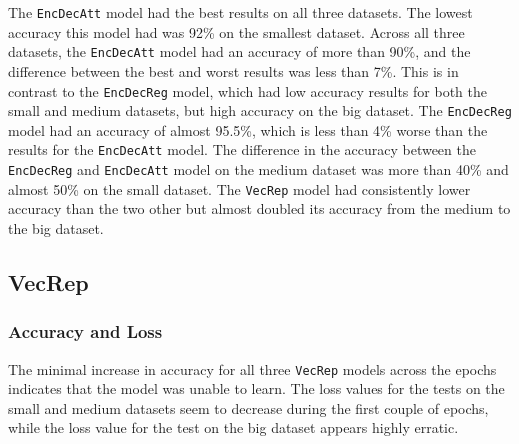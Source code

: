 The {\tt EncDecAtt} model had the best results on all three datasets. The lowest accuracy this model had was 92\% on the smallest dataset. Across all three datasets, the {\tt EncDecAtt} model had an accuracy of more than 90\%, and the difference between the best and worst results was less than 7\%. This is in contrast to the {\tt EncDecReg} model, which had low accuracy results for both the small and medium datasets, but high accuracy on the big dataset. The {\tt EncDecReg} model had an accuracy of almost 95.5\%, which is less than 4\% worse than the results for the {\tt EncDecAtt} model. The difference in the accuracy between the {\tt EncDecReg} and {\tt EncDecAtt} model on the medium dataset was more than 40\% and almost 50\% on the small dataset. The {\tt VecRep} model had consistently lower accuracy than the two other but almost doubled its accuracy from the medium to the big dataset.

\subsection{VecRep}
\subsubsection{Accuracy and Loss}
\newpage
{}

The minimal increase in accuracy for all three {\tt VecRep} models across the epochs indicates that the model was unable to learn. The loss values for the tests on the small and medium datasets seem to decrease during the first couple of epochs, while the loss value for the test on the big dataset appears highly erratic.

\newpage
